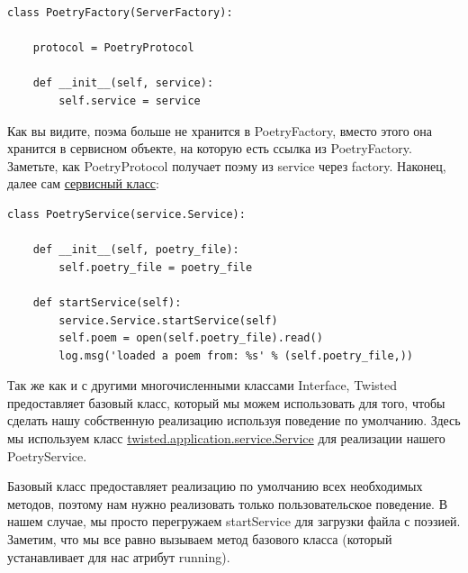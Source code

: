\begin{scriptsize}\begin{verbatim}
class PoetryFactory(ServerFactory):

    protocol = PoetryProtocol

    def __init__(self, service):
        self.service = service
\end{verbatim}\end{scriptsize}


Как вы видите, поэма больше не хранится в PoetryFactory, 
вместо этого она хранится в сервисном объекте, на которую 
есть ссылка из PoetryFactory. Заметьте, как PoetryProtocol получает 
поэму из service через factory. Наконец, далее сам 
\href{http://github.com/jdavisp3/twisted-intro/blob/master/twisted-server-3/fastpoetry.py#L27}{сервисный класс}:

\begin{scriptsize}\begin{verbatim}
class PoetryService(service.Service):

    def __init__(self, poetry_file):
        self.poetry_file = poetry_file

    def startService(self):
        service.Service.startService(self)
        self.poem = open(self.poetry_file).read()
        log.msg('loaded a poem from: %s' % (self.poetry_file,))
\end{verbatim}\end{scriptsize}


Так же как и с другими многочисленными классами Interface, 
Twisted предоставляет базовый класс, который мы можем 
использовать для того, чтобы сделать нашу 
собственную реализацию используя поведение по 
умолчанию. Здесь мы используем класс 
\href{http://twistedmatrix.com/trac/browser/tags/releases/twisted-10.0.0/twisted/application/service.py#L154}{twisted.application.service.Service} для реализации 
нашего PoetryService.


Базовый класс предоставляет реализацию по умолчанию 
всех необходимых методов, поэтому нам нужно 
реализовать только пользовательское поведение. В нашем случае, 
мы просто перегружаем startService для 
загрузки файла с поэзией. Заметим, что мы все равно вызываем 
метод базового класса (который устанавливает для нас 
атрибут running).


